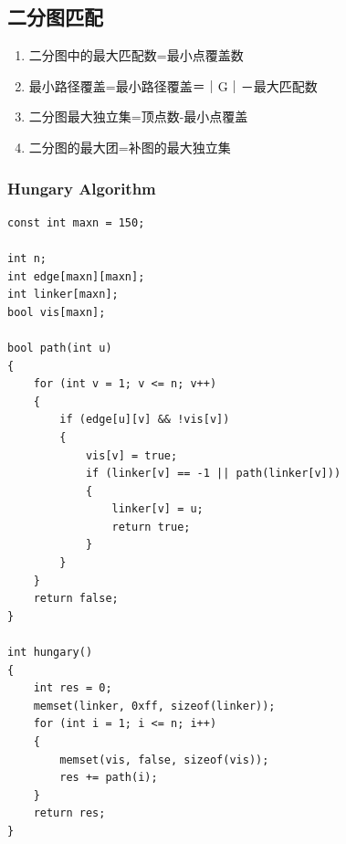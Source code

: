 \documentclass[twoside]{article}
\begin{document}
\subsection{二分图匹配}
\begin{enumerate}
\item 二分图中的最大匹配数=最小点覆盖数
\item 最小路径覆盖=最小路径覆盖＝｜G｜－最大匹配数
\item 二分图最大独立集=顶点数-最小点覆盖
\item 二分图的最大团=补图的最大独立集
\end{enumerate}\subsubsection{Hungary Algorithm}
\begin{lstlisting}
const int maxn = 150;

int n;
int edge[maxn][maxn];
int linker[maxn];
bool vis[maxn];

bool path(int u)
{
    for (int v = 1; v <= n; v++)
    {
        if (edge[u][v] && !vis[v])
        {
            vis[v] = true;
            if (linker[v] == -1 || path(linker[v]))
            {
                linker[v] = u;
                return true;
            }
        }
    }
    return false;
}

int hungary()
{
    int res = 0;
    memset(linker, 0xff, sizeof(linker));
    for (int i = 1; i <= n; i++)
    {
        memset(vis, false, sizeof(vis));
        res += path(i);
    }
    return res;
}\end{lstlisting}
\end{document}
